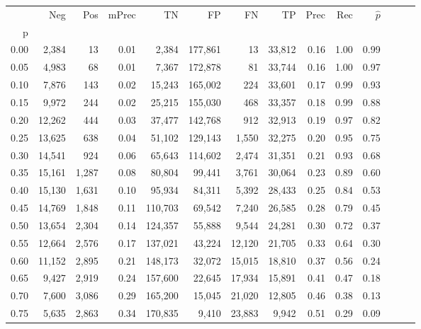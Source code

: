\begin{tabular}{rrrrrrrrrrrrrr}
\toprule
{} &     Neg &    Pos & mPrec &       TN &       FP &      FN &      TP &  Prec &   Rec & $\hat{p}$ \\
p    &         &        &       &          &          &         &         &       &       &           \\
\midrule
0.00 &   2,384 &     13 &  0.01 &    2,384 &  177,861 &      13 &  33,812 &  0.16 &  1.00 &      0.99 \\
0.05 &   4,983 &     68 &  0.01 &    7,367 &  172,878 &      81 &  33,744 &  0.16 &  1.00 &      0.97 \\
0.10 &   7,876 &    143 &  0.02 &   15,243 &  165,002 &     224 &  33,601 &  0.17 &  0.99 &      0.93 \\
0.15 &   9,972 &    244 &  0.02 &   25,215 &  155,030 &     468 &  33,357 &  0.18 &  0.99 &      0.88 \\
0.20 &  12,262 &    444 &  0.03 &   37,477 &  142,768 &     912 &  32,913 &  0.19 &  0.97 &      0.82 \\
0.25 &  13,625 &    638 &  0.04 &   51,102 &  129,143 &   1,550 &  32,275 &  0.20 &  0.95 &      0.75 \\
0.30 &  14,541 &    924 &  0.06 &   65,643 &  114,602 &   2,474 &  31,351 &  0.21 &  0.93 &      0.68 \\
0.35 &  15,161 &  1,287 &  0.08 &   80,804 &   99,441 &   3,761 &  30,064 &  0.23 &  0.89 &      0.60 \\
0.40 &  15,130 &  1,631 &  0.10 &   95,934 &   84,311 &   5,392 &  28,433 &  0.25 &  0.84 &      0.53 \\
0.45 &  14,769 &  1,848 &  0.11 &  110,703 &   69,542 &   7,240 &  26,585 &  0.28 &  0.79 &      0.45 \\
0.50 &  13,654 &  2,304 &  0.14 &  124,357 &   55,888 &   9,544 &  24,281 &  0.30 &  0.72 &      0.37 \\
0.55 &  12,664 &  2,576 &  0.17 &  137,021 &   43,224 &  12,120 &  21,705 &  0.33 &  0.64 &      0.30 \\
0.60 &  11,152 &  2,895 &  0.21 &  148,173 &   32,072 &  15,015 &  18,810 &  0.37 &  0.56 &      0.24 \\
0.65 &   9,427 &  2,919 &  0.24 &  157,600 &   22,645 &  17,934 &  15,891 &  0.41 &  0.47 &      0.18 \\
0.70 &   7,600 &  3,086 &  0.29 &  165,200 &   15,045 &  21,020 &  12,805 &  0.46 &  0.38 &      0.13 \\
0.75 &   5,635 &  2,863 &  0.34 &  170,835 &    9,410 &  23,883 &   9,942 &  0.51 &  0.29 &      0.09 \\

\end{tabular}
